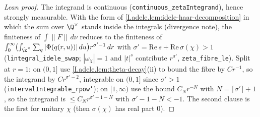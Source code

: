\begin{proof}[Lean proof]
The integrand is continuous (\texttt{continuous\_zetaIntegrand}), hence strongly measurable. With the form of \cref{I.adele.lem:idele-haar-decomposition} in which the sum over $\Q^\times$ stands inside the integrals (divergence note), the finiteness of $\int\|F\|\,d\nu$ reduces to the finiteness of $\int_0^\infty\bigl(\int_{\hat\Z^\times}\sum_q|\Phi(q(r,u))|\,du\bigr)r^{\sigma'-1}\,dr$ with $\sigma'=\mathrm{Re}\,s+\mathrm{Re}\,\sigma(\chi)>1$ (\texttt{lintegral\_idele\_swap}; $|\omega_\chi|=1$ and $|t|^s$ contribute $r^{\sigma'}$, \texttt{zeta\_fibre\_le}). Split at $r=1$: on $(0,1]$ use \cref{I.adele.lem:theta-decay}(ii) to bound the fibre by $Cr^{-1}$, so the integrand by $Cr^{\sigma'-2}$, integrable on $(0,1]$ since $\sigma'>1$ (\texttt{intervalIntegrable\_rpow'}); on $[1,\infty)$ use the bound $C_Nr^{-N}$ with $N=\lceil\sigma'\rceil+1$, so the integrand is $\le C_Nr^{\sigma'-1-N}$ with $\sigma'-1-N<-1$. The second clause is the first for unitary $\chi$ (then $\sigma(\chi)$ has real part $0$).
\end{proof}

